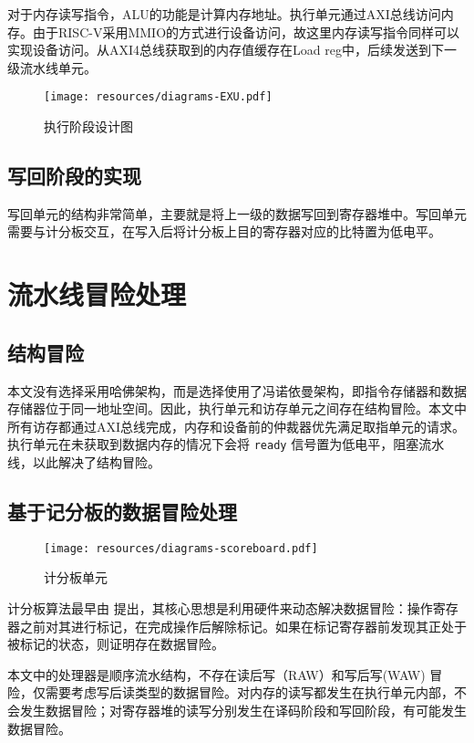 对于内存读写指令，ALU的功能是计算内存地址。执行单元通过AXI总线访问内存。由于RISC-V采用MMIO的方式进行设备访问，故这里内存读写指令同样可以实现设备访问。从AXI4总线获取到的内存值缓存在Load reg中，后续发送到下一级流水线单元。

\begin{figure}
    \centering
    \texttt{[image: resources/diagrams-EXU.pdf]}
    \caption{执行阶段设计图}
    \label{fig:stage-exe}
\end{figure}
\subsection{写回阶段的实现}

写回单元的结构非常简单，主要就是将上一级的数据写回到寄存器堆中。写回单元需要与计分板交互，在写入后将计分板上目的寄存器对应的比特置为低电平。

\section{流水线冒险处理} \label{sec:hazard}

\subsection{结构冒险}

本文没有选择采用哈佛架构，而是选择使用了冯诺依曼架构，即指令存储器和数据存储器位于同一地址空间。因此，执行单元和访存单元之间存在结构冒险。本文中所有访存都通过AXI总线完成，内存和设备前的仲裁器优先满足取指单元的请求。执行单元在未获取到数据内存的情况下会将 \lstinline{ready} 信号置为低电平，阻塞流水线，以此解决了结构冒险。

\subsection{基于记分板的数据冒险处理} \label{sec:scoreboard}

\begin{figure}
    \centering
    \texttt{[image: resources/diagrams-scoreboard.pdf]}
    \caption{计分板单元}
    \label{fig:scoreboard}
\end{figure}

计分板算法最早由 \citeauthor{thorntonParallelOperationControl1964} 提出\cite{thorntonParallelOperationControl1964}，其核心思想是利用硬件来动态解决数据冒险：操作寄存器之前对其进行标记，在完成操作后解除标记。如果在标记寄存器前发现其正处于被标记的状态，则证明存在数据冒险。

本文中的处理器是顺序流水结构，不存在读后写（RAW）和写后写(WAW) 冒险，仅需要考虑写后读类型的数据冒险。对内存的读写都发生在执行单元内部，不会发生数据冒险；对寄存器堆的读写分别发生在译码阶段和写回阶段，有可能发生数据冒险。


